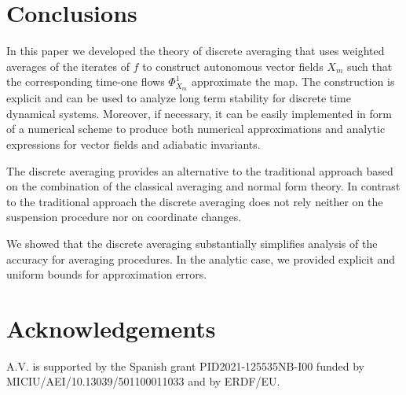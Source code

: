 \documentclass[a4paper,12pt]{article}
\begin{document}
\section{Conclusions}

In this paper we developed the theory of discrete averaging that 
uses weighted averages of the iterates of $f$ to construct  autonomous vector fields 
$X_m$ such that the corresponding time-one flows $\Phi^1_{X_m}$
approximate the map. The construction is explicit and can be used to analyze long term
stability for discrete time dynamical systems. Moreover, if necessary, it
 can be easily implemented in form of a numerical scheme to produce both numerical
 approximations and analytic expressions for vector fields and adiabatic invariants.

The discrete averaging provides an alternative to the traditional approach based 
on the combination of the classical averaging and normal form theory. 
In contrast to the traditional approach the discrete averaging does not
rely neither on the suspension procedure nor on coordinate changes.

We showed that the discrete averaging substantially simplifies
 analysis of the accuracy for averaging procedures. In the analytic case, we provided  explicit  and uniform bounds for  approximation errors.


\section*{Acknowledgements}
A.V. is supported by the Spanish grant PID2021-125535NB-I00 funded by 
MICIU/AEI/10.13039/501100011033 and by ERDF/EU.
\end{document}
